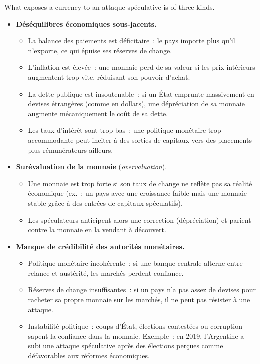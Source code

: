 What exposes a currency to an attaque spéculative is of three kinds.
\begin{itemize}
  \item \textbf{Déséquilibres économiques sous-jacents.}
    \begin{itemize}
      \item La balance des paiements est déficitaire~: le pays importe plus qu'il
        n'exporte, ce qui épuise ses réserves de change.
      \item L'inflation est élevée~: une monnaie perd de sa valeur si les prix
        intérieurs augmentent trop vite, réduisant son pouvoir d'achat.
      \item La dette publique est insoutenable~: si un État emprunte massivement en
        devises étrangères (comme en dollars), une dépréciation de sa monnaie augmente
        mécaniquement le coût de sa dette.
      \item Les taux d'intérêt sont trop bas~: une politique monétaire trop accommodante
        peut inciter à des sorties de capitaux vers des placements plus rémunérateurs
        ailleurs.
    \end{itemize}
  \item \textbf{Surévaluation de la monnaie} (\textit{overvaluation}).
    \begin{itemize}
      \item Une monnaie est trop forte si son taux de change ne reflète pas sa réalité
        économique (ex.~: un pays avec une croissance faible mais une monnaie stable
        grâce à des entrées de capitaux spéculatifs).
      \item Les spéculateurs anticipent alors une correction (dépréciation) et parient
        contre la monnaie en la vendant à découvert.
    \end{itemize}
  \item \textbf{Manque de crédibilité des autorités monétaires.}
    \begin{itemize}
      \item Politique monétaire incohérente~: si une banque centrale alterne entre
        relance et austérité, les marchés perdent confiance.
      \item Réserves de change insuffisantes~: si un pays n'a pas assez de devises pour
        racheter sa propre monnaie sur les marchés, il ne peut pas résister à une
        attaque.
      \item Instabilité politique~: coups d'État, élections contestées ou corruption
        sapent la confiance dans la monnaie. Exemple~: en 2019, l'Argentine a subi une
        attaque spéculative après des élections perçues comme défavorables aux réformes
        économiques.
    \end{itemize}
\end{itemize}

